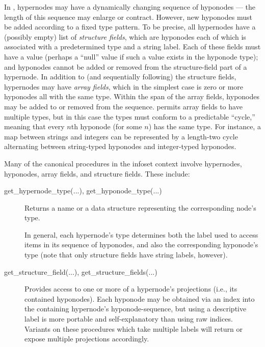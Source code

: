 \documentclass[12pt,letterpaper]{article}
\newcommand{\procitem}[1]{{#1}}
\newcommand{\HGDM}{\resizebox{!}{7.5pt}{\ATexttclr{HGDM}}}
\newcommand{\lHGDM}{\resizebox{!}{8.5pt}{\ATexttclr{H}}%
\resizebox{!}{7.5pt}{\ATexttclr{GDM}}}
\newcommand{\ATexttclr}[1]{\textcolor{tcolor}{\textbf{#1}}}
\newcommand{\p}[1]{

\vspace{.7em}#1}
\newcommand{\q}[1]{{\fontfamily{qcr}\selectfont ``}#1{\fontfamily{qcr}\selectfont ''}}
\begin{document}
{\p{In \HGDM{}, hypernodes may have a dynamically changing 
sequence of hyponodes --- the length of this sequence 
may enlarge or contract.  However, new hyponodes must be 
added according to a fixed type pattern.  To be precise, 
all hypernodes have a (possibly empty) list of 
\textit{structure fields}, which are hyponodes each 
of which is associated with a predetermined 
type and a string label.  Each of these fields must have a 
value (perhaps a \q{null} value if such a value exists 
in the hyponode type); and hyponodes cannot be added 
or removed from the structure-field part of a hypernode.  
In addition to (and sequentially following) the structure 
fields, hypernodes may have \textit{array fields}, 
which in the simplest case is zero or more hyponodes all 
with the same type.  Within the span of the array fields, 
hyponodes may be added to or removed from the sequence.  
\lHGDM{} permits array fields to have multiple types, 
but in this case the types must conform to a predictable 
\q{cycle,} meaning that every $n$th hyponode (for some $n$) 
has the same type.  For instance, a map between strings 
and integers can be represented by a length-two cycle 
alternating between string-typed hyponodes and integer-typed 
hyponodes.}

\p{Many of the canonical \HGDM{} procedures in the infoset 
context involve hypernodes, hyponodes, array fields, and 
structure fields.  These include: 


\begin{description}

\item[\procitem{get\_hypernode\_type(...)}, 
\procitem{get\_hyponode\_type(...)}]  Returns a 
name or a data structure representing the corresponding 
node's type.

\descindent{}  In general, each hypernode's type determines 
both the label used to access items in its sequence of hyponodes, 
and also the corresponding hyponode's type (note that only 
structure fields have string labels, however). 
   
\item[\procitem{get\_structure\_field(...)}, 
\procitem{get\_structure\_fields(...)}]  Provides 
access to one or more of a hypernode's projections 
(i.e., its contained hyponodes).  Each hyponode may be 
obtained via an index into the containing hypernode's 
hyponode-sequence, but using a descriptive label 
is more portable and self-explanatory than using raw 
indices.  Variants on these procedures which take 
multiple labels will return or expose multiple 
projections accordingly.


\end{description}}}
\end{document}
